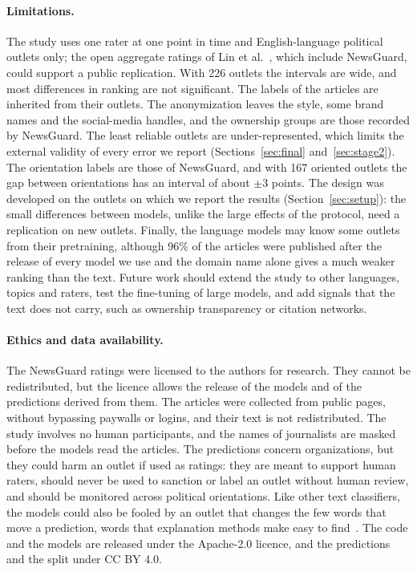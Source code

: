 \documentclass[11pt,a4paper]{article}
\begin{document}
\paragraph{Limitations.} The study uses one rater at one point in time and English-language political outlets only; the
open aggregate ratings of Lin et al.~\cite{lin2023high}, which include NewsGuard, could support a public replication.
With 226 outlets the intervals are wide, and most differences in ranking are not significant. The labels of the articles
are inherited from their outlets. The anonymization leaves the style, some brand names and the social-media handles, and
the ownership groups are those recorded by NewsGuard. The least reliable outlets are under-represented, which limits the external validity of every error we report
(Sections~\ref{sec:final} and~\ref{sec:stage2}). The orientation labels are those of NewsGuard, and with 167 oriented
outlets the gap between orientations has an interval of about $\pm 3$ points. The design was developed on the outlets on which we report the results (Section~\ref{sec:setup}): the small differences
between models, unlike the large effects of the protocol, need a replication on new outlets. Finally, the
language models may know some outlets from their pretraining, although 96\% of the articles were published after the
release of every model we use and the domain name alone gives a much weaker ranking than the text. Future work should
extend the study to other languages, topics and raters, test the fine-tuning of large models, and add signals that the
text does not carry, such as ownership transparency or citation networks.

\paragraph{Ethics and data availability.}
The NewsGuard ratings were licensed to the authors for research. They cannot be redistributed, but the licence allows
the release of the models and of the predictions derived from them. The articles were collected from public pages,
without bypassing paywalls or logins, and their text is not redistributed. The study involves no human participants,
and the names of journalists are masked before the models read the articles. The predictions concern organizations, but
they could harm an outlet if used as ratings: they are meant to support human raters, should never be used to sanction
or label an outlet without human review, and should be monitored across political orientations. Like other text
classifiers, the models could also be fooled by an outlet that changes the few words that move a prediction, words that
explanation methods make easy to find~\cite{kozik2024explainability}. The code and the models are released under the
Apache-2.0 licence, and the predictions and the split under CC BY 4.0.
\end{document}

